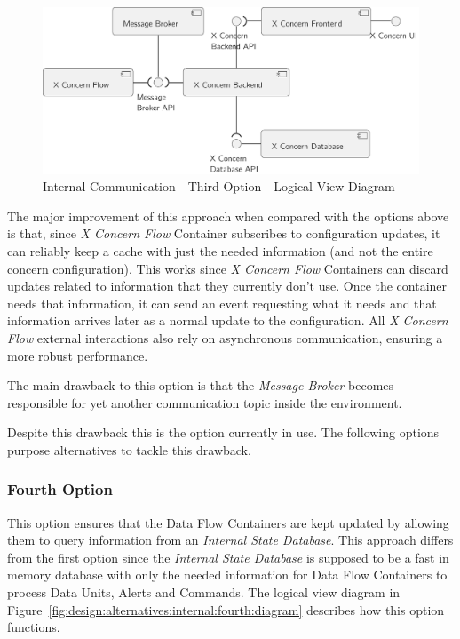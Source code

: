 \begin{figure}[H]
   \centering
   \includegraphics[page=1,width=0.8\columnwidth]{assets/diagrams/design/alternatives/internal/alternative3.pdf}
   \caption[Internal Communication - Third Option - Logical View Diagram]{Internal Communication - Third Option - Logical View Diagram}
   \label{fig:design:alternatives:internal:third:diagram}
\end{figure}

The major improvement of this approach when compared with the options above is that, since \textit{X Concern Flow} Container subscribes to configuration updates, it can reliably keep a cache with just the needed information (and not the entire concern configuration). This works since \textit{X Concern Flow} Containers can discard updates related to information that they currently don't use. Once the container needs that information, it can send an event requesting what it needs and that information arrives later as a normal update to the configuration.
All \textit{X Concern Flow} external interactions also rely on asynchronous communication, ensuring a more robust performance.

The main drawback to this option is that the \textit{Message Broker} becomes responsible for yet another communication topic inside the environment.

Despite this drawback this is the option currently in use. The following options purpose alternatives to tackle this drawback.

\subsubsection{Fourth Option}
\label{subsubsec:design:alternatives:internal:fourth}

This option ensures that the Data Flow Containers are kept updated by allowing them to query information from an \textit{Internal State Database}. This approach differs from the first option since the \textit{Internal State Database} is supposed to be a fast in memory database with only the needed information for Data Flow Containers to process Data Units, Alerts and Commands. The logical view diagram in Figure~\ref{fig:design:alternatives:internal:fourth:diagram} describes how this option functions.

